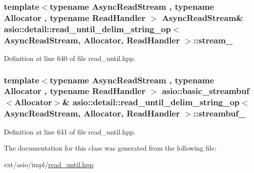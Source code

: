 \subsubsection[{stream\+\_\+}]{\setlength{\rightskip}{0pt plus 5cm}template$<$typename Async\+Read\+Stream , typename Allocator , typename Read\+Handler $>$ Async\+Read\+Stream\& {\bf asio\+::detail\+::read\+\_\+until\+\_\+delim\+\_\+string\+\_\+op}$<$ Async\+Read\+Stream, Allocator, Read\+Handler $>$\+::stream\+\_\+}\label{classasio_1_1detail_1_1read__until__delim__string__op_afcad1583fe64f8d6eb8b5ca51b0f2510}


Definition at line 640 of file read\+\_\+until.\+hpp.

\hypertarget{classasio_1_1detail_1_1read__until__delim__string__op_a5ceafbc126fdd4ca7025d250e9d4fcdf}{}
\subsubsection[{streambuf\+\_\+}]{\setlength{\rightskip}{0pt plus 5cm}template$<$typename Async\+Read\+Stream , typename Allocator , typename Read\+Handler $>$ {\bf asio\+::basic\+\_\+streambuf}$<$Allocator$>$\& {\bf asio\+::detail\+::read\+\_\+until\+\_\+delim\+\_\+string\+\_\+op}$<$ Async\+Read\+Stream, Allocator, Read\+Handler $>$\+::streambuf\+\_\+}\label{classasio_1_1detail_1_1read__until__delim__string__op_a5ceafbc126fdd4ca7025d250e9d4fcdf}


Definition at line 641 of file read\+\_\+until.\+hpp.



The documentation for this class was generated from the following file\+:\begin{DoxyCompactItemize}
\item 
ext/asio/impl/\hyperlink{impl_2read__until_8hpp}{read\+\_\+until.\+hpp}\end{DoxyCompactItemize}
